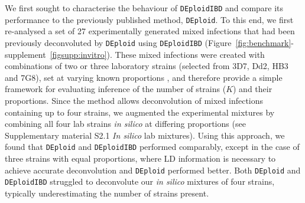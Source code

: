 \documentclass[9pt,lineno]{elife}
\begin{document}
We first sought to characterise the behaviour of \texttt{DEploidIBD} and compare its performance to the previously published method, \texttt{DEploid}.  To this end, we first re-analysed a set of 27 experimentally generated mixed infections \citep{Wendler2015} that had been previously deconvoluted by \texttt{DEploid} \citep{Zhu2017} using \texttt{DEploidIBD} (Figure~\ref*{fig:benchmark}-supplement~\ref*{figsupp:invitro}). These mixed infections were created with combinations of two or three laboratory strains (selected from 3D7, Dd2, HB3 and 7G8), set at varying known proportions \citep{Wendler2015}, and therefore provide a simple framework for evaluating inference of the number of strains ($K$) and their proportions. Since the method allows deconvolution of mixed infections containing up to four strains, we augmented the experimental mixtures by combining all four lab strains {\it in silico} at differing proportions (see Supplementary material S2.1 {\it In silico} lab mixtures). Using this approach, we found that \texttt{DEploid} and \texttt{DEploidIBD} performed comparably, except in the case of three strains with equal proportions, where LD information is necessary to achieve accurate deconvolution and \texttt{DEploid} performed better. Both \texttt{DEploid} and \texttt{DEploidIBD} struggled to deconvolute our {\it in silico} mixtures of four strains, typically underestimating the number of strains present.
\end{document}

